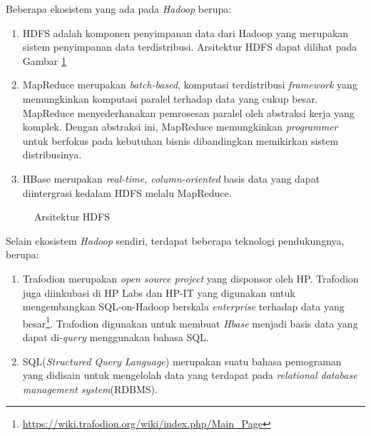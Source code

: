 Beberapa ekosistem yang ada pada \textit{Hadoop} berupa:

\begin{enumerate}
	\item HDFS adalah komponen penyimpanan data dari Hadoop yang merupakan sistem penyimpanan data terdistribusi. Arsitektur HDFS dapat dilihat pada Gambar \ref{fig:arsitektur_hdfs}
	\item MapReduce merupakan \textit{batch-based}, komputasi terdistribusi \textit{framework} yang memungkinkan komputasi paralel terhadap data yang cukup besar. MapReduce menyederhanakan pemrosesan paralel oleh abstraksi kerja yang komplek. Dengan abstraksi ini, MapReduce memungkinkan \textit{programmer} untuk berfokus pada kebutuhan bisnis dibandingkan memikirkan sistem distribusinya.
	\item HBase merupakan \textit{real-time, column-oriented} basis data yang dapat diintergrasi kedalam HDFS melalu MapReduce.
\end{enumerate}

\begin{figure}
\centering
{}
\caption[Arsitektur HDFS]{Arsitektur HDFS} 
\label{fig:arsitektur_hdfs}
\end{figure}

Selain ekosistem \textit{Hadoop} sendiri, terdapat beberapa teknologi pendukungnya, berupa:

\begin{enumerate}
	\item Trafodion merupakan \textit{open source project} yang disponsor oleh HP. Trafodion juga diinkubasi di HP Labs dan HP-IT yang digunakan untuk mengembangkan SQL-on-Hadoop berskala \textit{enterprise} terhadap data yang besar\footnote{\url{https://wiki.trafodion.org/wiki/index.php/Main\_Page}}. Trafodion digunakan untuk membuat \textit{Hbase} menjadi basis data yang dapat di-\textit{query} menggunakan bahasa SQL.
	\item SQL(\textit{Structured Query Language}) merupakan suatu bahasa pemograman yang didisain untuk mengelolah data yang terdapat pada \textit{relational database management system}(RDBMS).
\end{enumerate}

